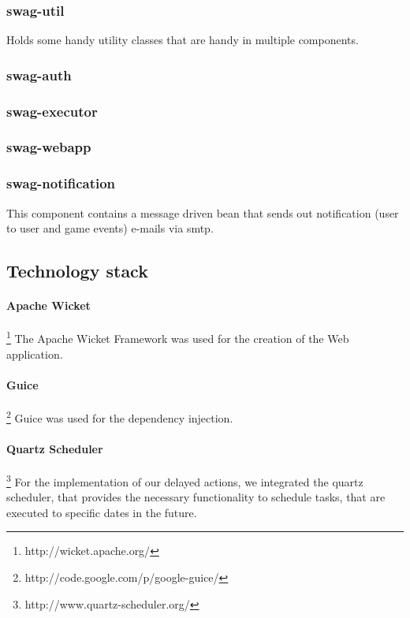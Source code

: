 \documentclass[a4paper]{article}
\begin{document}
\subsubsection{swag-util}
Holds some handy utility classes that are handy in multiple components.

\subsubsection{swag-auth}

\subsubsection{swag-executor}

\subsubsection{swag-webapp}

\subsubsection{swag-notification}
This component contains a message driven bean that sends out notification (user to user and game events)  e-mails via smtp.


\subsection{Technology stack}
\paragraph{Apache Wicket}\footnote{http://wicket.apache.org/}
The Apache Wicket Framework was used for the creation of the Web application.

\paragraph{Guice}\footnote{http://code.google.com/p/google-guice/}
Guice was used for the dependency injection.

\paragraph{Quartz Scheduler} \footnote{http://www.quartz-scheduler.org/}
For the implementation of our delayed actions, we integrated the quartz scheduler, that provides the necessary functionality to schedule tasks, that are executed to specific dates in the future.
\end{document}
